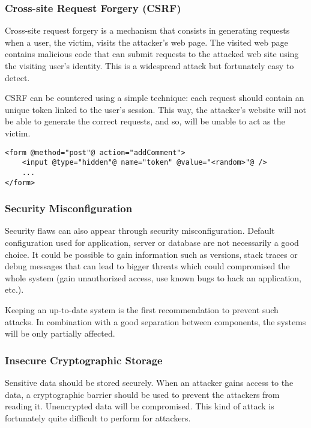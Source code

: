 \subsubsection{Cross-site Request Forgery (CSRF)}

Cross-site request forgery is a mechanism that consists in generating requests
when a user, the victim, visits the attacker's web page. The visited web page
contains malicious code that can submit requests to the attacked web site
using the visiting user's identity.
This is a widespread attack but fortunately easy to detect.


CSRF can be countered using a simple technique:
each request should contain an unique token linked to the user's session. This
way, the attacker's website will not be able to generate the correct requests,
and so, will be unable to act as the victim.

\begin{lstlisting}[style=beamer,
	caption={A protected form against CSRF}]
<form @method="post"@ action="addComment">
	<input @type="hidden"@ name="token" @value="<random>"@ />
	...
</form>
\end{lstlisting}

\subsubsection{Security Misconfiguration}

Security flaws can also appear through security misconfiguration. Default
configuration used for application, server or database are not necessarily a
good choice. It could be possible to gain information such as versions,
stack traces or debug messages that can lead to bigger threats which could
compromised the whole system (gain unauthorized access, use known bugs to hack
an application, etc.).

Keeping an up-to-date system is the first recommendation to prevent such
attacks. In combination with a good separation between components, the systems
will be only partially affected.

\subsubsection{Insecure Cryptographic Storage}

Sensitive data should be stored securely.
When an attacker gains access to the data, a cryptographic barrier should be
used to prevent the attackers from reading it. Unencrypted data will be
compromised. This kind of attack is fortunately quite difficult to perform for
attackers.

